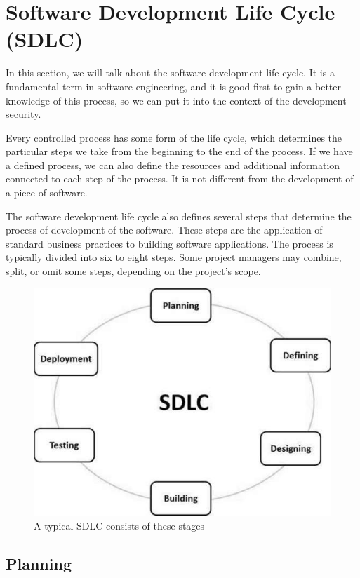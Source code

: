 \documentclass[12pt,a4,twoside]{article}
\begin{document}
\newpage

\section{Software Development Life Cycle (SDLC)}
\label{sec:sdlc}

In this section, we will talk about the software development life cycle. It is a fundamental term in software engineering, and it is good first to gain a better knowledge of this process, so we can put it into the context of the development security.

Every controlled process has some form of the life cycle, which determines the particular steps we take from the beginning to the end of the process. If we have a defined process, we can also define the resources and additional information connected to each step of the process. It is not different from the development of a piece of software.

The software development life cycle also defines several steps that determine the process of development of the software. These steps are the application of standard business practices to building software applications. The process is typically divided into six to eight steps. Some project managers may combine, split, or omit some steps, depending on the project's scope. \cite{sdlc_phoenix}

\begin{figure}[h]
\centering
\includegraphics[width=.8\textwidth]{figures/sdlc_stages.jpg}
\caption{A typical SDLC consists of these stages \cite{sdlc_tutorials_point}}
\label{fig:sdlc_stages}
\end{figure}

\subsection{Planning}
\end{document}
